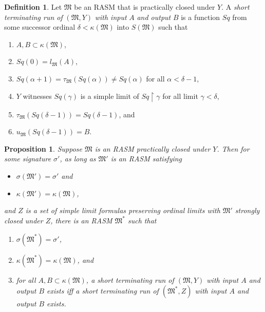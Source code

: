 \documentclass[12pt, twoside]{memoir}
\numberwithin{equation}{section}
\newtheorem{prop}[thm]{Proposition}
\theoremstyle{definition}
\newtheorem{defi}[thm]{Definition}
\theoremstyle{remark}
\theoremstyle{definition}
\theoremstyle{definition}
\theoremstyle{definition}
\theoremstyle{remark}
\begin{document}
\begin{defi}
Let $\mathfrak{M}$ be an RASM that is practically closed under $Y$. A \emph{short terminating run of} $(\mathfrak{M}, Y)$ \emph{with input} $A$ \emph{and output} $B$ is a function $Sq$ from some successor ordinal $\delta < \kappa(\mathfrak{M})$ into $S(\mathfrak{M})$ such that 
\begin{enumerate}[label=(\alph*)]
    \item $A, B \subset \kappa(\mathfrak{M})$,
    \item $Sq(0) = l_{\mathfrak{M}}(A)$,
    \item $Sq(\alpha + 1) = \tau_{\mathfrak{M}}(Sq(\alpha)) \neq Sq(\alpha)$ for all $\alpha < \delta - 1$,
    \item $Y$ witnesses $Sq(\gamma)$ is a simple limit of $Sq \restriction \gamma$ for all limit $\gamma < \delta$,
    \item $\tau_{\mathfrak{M}}(Sq(\delta - 1)) = Sq(\delta - 1)$, and
    \item $u_{\mathfrak{M}}(Sq(\delta - 1)) = B$.
\end{enumerate}
\end{defi}

\begin{prop}\label{prop239}
Suppose $\mathfrak{M}$ is an RASM practically closed under $Y$. Then for some signature $\sigma'$, as long as $\mathfrak{M}'$ is an RASM satisfying 
\begin{itemize}
    \item $\sigma(\mathfrak{M}') = \sigma'$ and
    \item $\kappa(\mathfrak{M}') = \kappa(\mathfrak{M})$,
\end{itemize}
and $Z$ is a set of simple limit formulas preserving ordinal limits with $\mathfrak{M}'$ strongly closed under $Z$, there is an RASM $\mathfrak{M}^*$ such that
\begin{enumerate}[label=(\alph*)]
    \item\label{2391} $\sigma(\mathfrak{M}^*) = \sigma'$,
    \item\label{2392} $\kappa(\mathfrak{M}^*) = \kappa(\mathfrak{M})$, and
    \item\label{2393} for all $A, B \subset \kappa(\mathfrak{M})$, a short terminating run of $(\mathfrak{M}, Y)$ with input $A$ and output $B$ exists iff a short terminating run of $(\mathfrak{M}^*, Z)$ with input $A$ and output $B$ exists.
\end{enumerate}
\end{prop}
\end{document}
